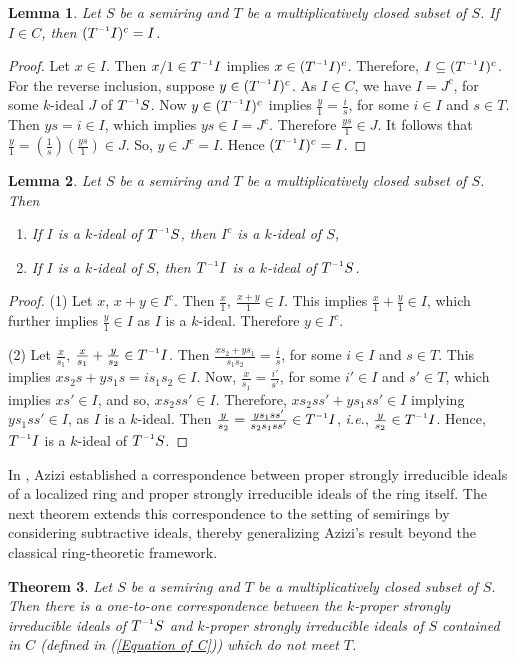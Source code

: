 \documentclass[11pt,leqno]{amsart}
\newcommand{\inv}{^{\raisebox{.2ex}{$\scriptscriptstyle-1$}}}
\newtheorem{theorem}{Theorem}[section]
\newtheorem{lemma}[theorem]{Lemma}
\theoremstyle{definition}
\numberwithin{equation}{section}
\begin{document}
\begin{lemma}
    Let $S$ be a semiring and $T$ be a multiplicatively closed subset of $S$. If $I \in C$, then $(T\inv I)^c =I$.
\end{lemma}

\begin{proof}
    Let $x\in I$. Then $x/1 \in T\inv I$ implies $x \in (T\inv I)^c$. Therefore, $I \subseteq (T\inv I)^c$.
For the reverse inclusion, suppose $y \in (T\inv I)^c$. As $I \in C$, we have $I=J^c$, for some $k$-ideal $J$ of $T\inv S$. Now $y \in (T\inv I)^c $ implies $\frac{y}{1}=\frac{i}{s}$, for some $i\in I$ and $s\in T$. Then $ys=i \in I$, which implies $ys \in I=J^c$. Therefore $\frac{ys}{1} \in J$. It follows that $\frac{y}{1}=(\frac{1}{s})(\frac{ys}{1})\in J$. So, $y \in J^c=I$. Hence $(T\inv I)^c=I$. 
\end{proof}
\begin{lemma}\label{loc5}
    Let $S$ be a semiring and $T$ be a multiplicatively closed subset of $S$. Then 
    \begin{enumerate}
        \item If $I$ is a $k$-ideal of $T\inv S$, then $I^c$ is a $k$-ideal of $S$,
        \item If $I$ is a $k$-ideal of $S$, then $T\inv I$ is a $k$-ideal of $T\inv S$.
    \end{enumerate}
    
\end{lemma}

\begin{proof}
    (1) Let $x$, $x+y \in I^c$. Then $\frac{x}{1},\ \frac{x+y}{1} \in I$. This implies $\frac{x}{1}+\frac{y}{1}\in I$, which further implies $\frac{y}{1} \in I$ as $I$ is a $k$-ideal. Therefore $y\in I^c$.
    
    (2) Let $\frac{x}{s_1}$, $\frac{x}{s_1}+\frac{y}{s_2} \in T\inv I$. Then $\frac{xs_2+ys_1}{s_1s_2}=\frac{i}{s}$, for some $i\in I$ and $s\in T$. This implies $xs_2s+ys_1s=is_1s_2\in I$. Now, $\frac{x}{s_1}=\frac{i'}{s'}$, for some $i'\in I$ and $s'\in T$, which implies $xs'\in I$, and so, $xs_2ss'\in I$. Therefore, $xs_2ss'+ys_1ss'\in I$ implying $ys_1ss'\in I$, as $I$ is a $k$-ideal. Then $\frac{y}{s_2}=\frac{ys_1ss'}{s_2s_1ss'}\in T\inv I$, \textit{i.e.},  $\frac{y}{s_2} \in T\inv I$. Hence, $T\inv I$ is a $k$-ideal of $T\inv S$.
\end{proof}
In \cite[Theorem 3.1]{Azizi08}, Azizi established a correspondence between proper strongly irreducible ideals of a localized ring and proper strongly irreducible ideals of the ring itself. The next theorem extends this correspondence to the setting of semirings by considering subtractive ideals, thereby generalizing Azizi's result beyond the classical ring-theoretic framework.
\begin{theorem} \label{loc}
Let $S$  be a semiring and $T$ be a multiplicatively closed subset of $S$. Then
there is a one-to-one correspondence between the $k$-proper strongly irreducible ideals of $T\inv{S}$ 
and $k$-proper strongly irreducible ideals of $S$  contained in $C$ (defined in (\ref{Equation of C})) which do not meet $T$.
\end{theorem}
\end{document}
